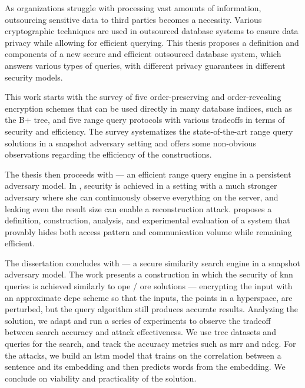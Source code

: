 As organizations struggle with processing vast amounts of information, outsourcing sensitive data to third parties becomes a necessity.
Various cryptographic techniques are used in outsourced database systems to ensure data privacy while allowing for efficient querying.
This thesis proposes a definition and components of a new secure and efficient outsourced database system, which answers various types of queries, with different privacy guarantees in different security models.

This work starts with the survey of five order-preserving and order-revealing encryption schemes that can be used directly in many database indices, such as the B+ tree, and five range query protocols with various tradeoffs in terms of security and efficiency.
The survey systematizes the state-of-the-art range query solutions in a snapshot adversary setting and offers some non-obvious observations regarding the efficiency of the constructions.

The thesis then proceeds with \epsolute{} --- an efficient range query engine in a persistent adversary model.
In \epsolute{}, security is achieved in a setting with a much stronger adversary where she can continuously observe everything on the server, and leaking even the result size can enable a reconstruction attack.
\epsolute{} proposes a definition, construction, analysis, and experimental evaluation of a system that provably hides both access pattern and communication volume while remaining efficient.

The dissertation concludes with \kanon{} --- a secure similarity search engine in a snapshot adversary model.
The work presents a construction in which the security of \acrshort{knn} queries is achieved similarly to \acrshort{ope} / \acrshort{ore} solutions --- encrypting the input with an approximate \acrlong{dcpe} scheme so that the inputs, the points in a hyperspace, are perturbed, but the query algorithm still produces accurate results.
Analyzing the solution, we adapt and run a series of experiments to observe the tradeoff between search accuracy and attack effectiveness.
We use \acrshort{trec} datasets and queries for the search, and track the accuracy metrics such as \acrshort{mrr} and \acrshort{ndcg}.
For the attacks, we build an \acrshort{lstm} model that trains on the correlation between a sentence and its embedding and then predicts words from the embedding.
We conclude on viability and practicality of the solution.
